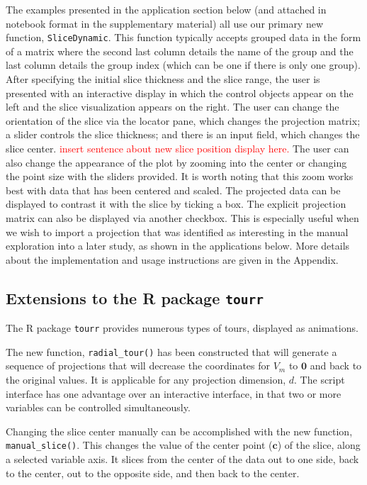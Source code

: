 \documentclass[]{interact}
\theoremstyle{plain}%
\theoremstyle{definition}
\theoremstyle{remark}
\begin{document}
The examples presented in the application section below (and attached in
notebook format in the supplementary material) all use our primary new
function, \texttt{SliceDynamic}. This function typically accepts grouped
data in the form of a matrix where the second last column details the
name of the group and the last column details the group index (which can
be one if there is only one group). After specifying the initial slice
thickness and the slice range, the user is presented with an interactive
display in which the control objects appear on the left and the slice
visualization appears on the right. The user can change the orientation
of the slice via the locator pane, which changes the projection matrix;
a slider controls the slice thickness; and there is an input field,
which changes the slice center.
\textcolor{red}{insert sentence about new slice position display here.}
The user can also change the appearance of the plot by zooming into the
center or changing the point size with the sliders provided. It is worth
noting that this zoom works best with data that has been centered and
scaled. The projected data can be displayed to contrast it with the
slice by ticking a box. The explicit projection matrix can also be
displayed via another checkbox. This is especially useful when we wish
to import a projection that was identified as interesting in the manual
exploration into a later study, as shown in the applications below. More
details about the implementation and usage instructions are given in the
Appendix.

\hypertarget{extensions-to-the-r-package-tourr}{%
\subsection{\texorpdfstring{Extensions to the R package
\texttt{tourr}}{Extensions to the R package tourr}}\label{extensions-to-the-r-package-tourr}}

The R package \texttt{tourr} provides numerous types of tours, displayed
as animations.

The new function, \texttt{radial\_tour()} has been constructed that will
generate a sequence of projections that will decrease the coordinates
for \(V_m\) to \(\boldsymbol{0}\) and back to the original values. It is
applicable for any projection dimension, \(d\). The script interface has
one advantage over an interactive interface, in that two or more
variables can be controlled simultaneously.

Changing the slice center manually can be accomplished with the new
function, \texttt{manual\_slice()}. This changes the value of the center
point (\(\mathbf{c}\)) of the slice, along a selected variable axis. It
slices from the center of the data out to one side, back to the center,
out to the opposite side, and then back to the center.
\end{document}

